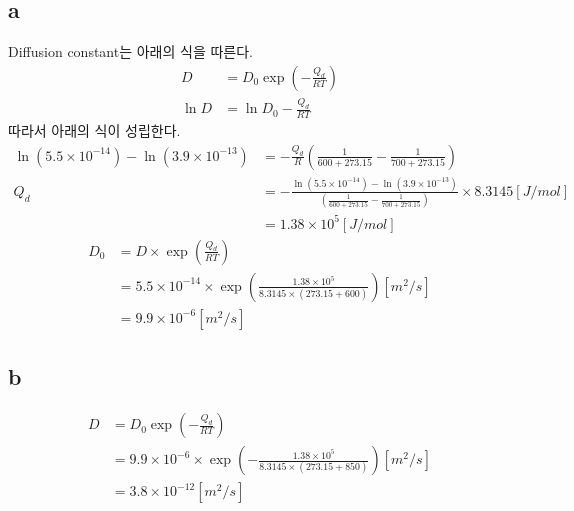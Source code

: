 \documentclass[a4paper]{oblivoir}
\begin{document}
\subsection{a}
Diffusion constant는 아래의 식을 따른다.
\begin{align}
	D &= D_{0}\exp(-\frac{Q_{d}}{RT})\\
	\ln D &= \ln D_{0} -\frac{Q_{d}}{RT}
\end{align}
따라서 아래의 식이 성립한다.
\begin{align}
	\ln (5.5\times 10^{-14})  - \ln (3.9\times 10^{-13})&=  -\frac{Q_{d}}{R}\left( \frac{1}{600+273.15}  - \frac{1}{700+273.15} \right)\\
	Q_{d} &= -\frac{\ln (5.5\times 10^{-14})  - \ln (3.9\times 10^{-13})}{\left( \frac{1}{600+273.15}  - \frac{1}{700+273.15} \right)}\times 8.3145 [J/mol]\\
	&= 1.38\times 10^{5} [J/mol]
\end{align}
\begin{align}
	D_{0} &= D\times \exp(\frac{Q_{d}}{RT})\\
	&= 5.5\times 10^{-14} \times \exp(\frac{1.38\times 10^{5}}{8.3145\times (273.15+600)}) [m^{2}/s]\\
	&= 9.9 \times 10^{-6} [m^{2}/s]
\end{align}

\subsection{b}
\begin{align}
	D &= D_{0}\exp(-\frac{Q_{d}}{RT})\\
	&= 9.9 \times 10^{-6}\times \exp(-\frac{1.38\times 10^{5}}{8.3145 \times (273.15+850)}) [m^{2}/s]\\
	&= 3.8\times 10^{-12} [m^{2}/s]
\end{align}
\end{document}
